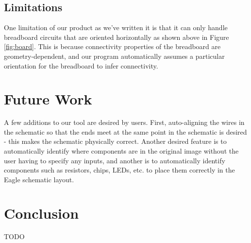 \documentclass[10pt,twocolumn,letterpaper]{article}
\begin{document}
\subsection{Limitations}

One limitation of our product as we've written it is that it can only handle
breadboard circuits that are oriented horizontally as shown above in Figure
\ref{fig:board}. This is because connectivity properties of the breadboard are
geometry-dependent, and our program automatically assumes a particular
orientation for the breadboard to infer connectivity.  

\section{Future Work}

A few additions to our tool are desired by users. First, auto-aligning the
wires in the schematic so that the ends meet at the same point in the schematic
is desired - this makes the schematic physically correct. Another desired
feature is to automatically identify where components are in the original image
without the user having to specify any inputs, and another is to automatically
identify components such as resistors, chips, LEDs, etc. to place them
correctly in the Eagle schematic layout.  

\section{Conclusion}

TODO

{\small


}
\end{document}
